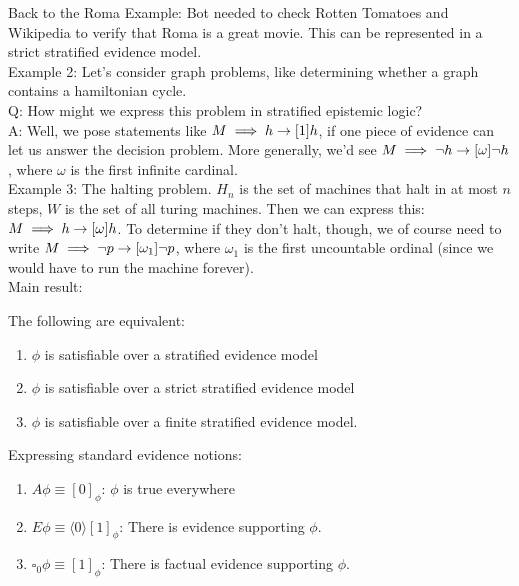 Back to the Roma Example: Bot needed to check Rotten Tomatoes and Wikipedia to verify that Roma is a great movie. This can be represented in a strict stratified evidence model. \\

Example 2: Let's consider graph problems, like determining whether a graph contains a hamiltonian cycle. \\

Q: How might we express this problem in stratified epistemic logic? \\

A: Well, we pose statements like $M \implies h \rightarrow [1]h$, if one piece of evidence can let us answer the decision problem. More generally, we'd see $M \implies \neg h \rightarrow [\omega]\neg h$, where $\omega$ is the first infinite cardinal. \\

Example 3: The halting problem. $H_n$ is the set of machines that halt in at most $n$ steps, $W$ is the set of all turing machines. Then we can express this: $M \implies h \rightarrow [\omega]h$. To determine if they don't halt, though, we of course need to write $M \implies \neg p \rightarrow [\omega_1]\neg p$, where $\omega_1$ is the first uncountable ordinal (since we would have to run the machine forever).\\

Main result:
\begin{theorem}
The following are equivalent:
\begin{enumerate}
    \item $\phi$ is satisfiable over a stratified evidence model
    \item $\phi$ is satisfiable over a strict stratified evidence model
    \item $\phi$ is satisfiable over a finite stratified evidence model.
\end{enumerate}
\end{theorem}

Expressing standard evidence notions:
\begin{enumerate}
    \item $A\phi \equiv [0]_\phi$: $\phi$ is true everywhere
    \item $E \phi \equiv \langle 0\rangle [1]_\phi$: There is evidence supporting $\phi$.
    \item $\square_0 \phi \equiv [1]_\phi$: There is factual evidence supporting $\phi$.
\end{enumerate}

